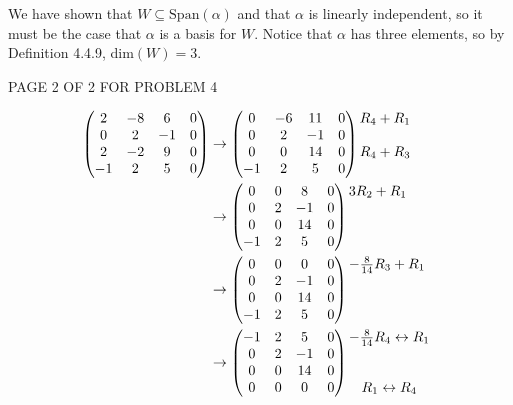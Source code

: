\documentclass[12pt]{article}
\newenvironment{problem}[2][Problem]
{
	\begin{trivlist} 
		\item[\hskip \labelsep {\bfseries #1 #2:}]
	}
{
	\end{trivlist}
	}
\begin{document}
\begin{problem}{5}
We have shown that $W \subseteq \text{Span}(\alpha)$ and that $\alpha$ is linearly independent, so it must be the case that $\alpha$ is a basis for $W$. Notice that $\alpha$ has three elements, so by Definition 4.4.9, dim$(W) = 3$.
\vfill
\centerline{PAGE 2 OF 2 FOR PROBLEM 4}
\newpage
\begin{align*}
\begin{pmatrix} 2&-8&6&0\\0&2&-1&0\\2&-2&9&0\\-1&2&5&0 \end{pmatrix} &\rightarrow \begin{pmatrix} 0&-6&11&0\\0&2&-1&0\\0&0&14&0\\-1&2&5&0 \end{pmatrix} \begin{matrix} R_4 + R_1\hphantom{1} \\ \hphantom{1} \\ R_4 + R_3 \hphantom{1} \\ \hphantom{1}\end{matrix}\\
%
&\rightarrow \begin{pmatrix} 0&0&8&0\\0&2&-1&0\\0&0&14&0\\-1&2&5&0 \end{pmatrix} \begin{matrix} 3R_2 + R_1\hphantom{1} \\ \hphantom{1} \\ \hphantom{1} \\ \hphantom{1}\end{matrix}\\
%
&\rightarrow \begin{pmatrix} 0&0&0&0\\0&2&-1&0\\0&0&14&0\\-1&2&5&0 \end{pmatrix} \begin{matrix} -\frac{8}{14}R_3 + R_1\hphantom{1} \\ \hphantom{1} \\ \hphantom{1} \\ \hphantom{1}\end{matrix}\\
%
&\rightarrow \begin{pmatrix} -1&2&5&0\\0&2&-1&0\\0&0&14&0\\0&0&0&0 \end{pmatrix} \begin{matrix} -\frac{8}{14}R_4 \leftrightarrow R_1\hphantom{1} \\ \hphantom{1} \\ \hphantom{1} \\ R_1 \leftrightarrow R_4 \hphantom{1}\end{matrix}

\end{align*}
\end{problem}
\end{document}
